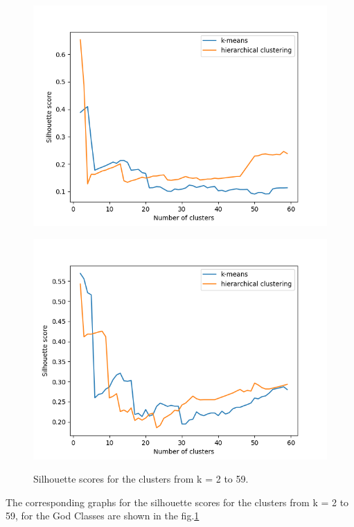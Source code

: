 \documentclass{article}
\begin{document}
\begin{figure}
\begin{minipage}{0.45\linewidth}
	    \includegraphics[width=\linewidth]{XIncludeHandler_silhouette_scores.png}
	\label{fig:subfig3}
         \end{minipage}
         \begin{minipage}{0.45\linewidth}
	    \includegraphics[width=\linewidth]{XSDHandler_silhouette_scores.png}
	\label{fig:subfig4}
         \end{minipage}
\caption{Silhouette scores for the clusters from k = 2 to 59.}
\label{fig:fig1}
\end{figure}
The corresponding graphs for the silhouette scores for the clusters from k = 2 to 59, for the God Classes are shown in the fig.\ref{fig:fig1}
\end{document}
